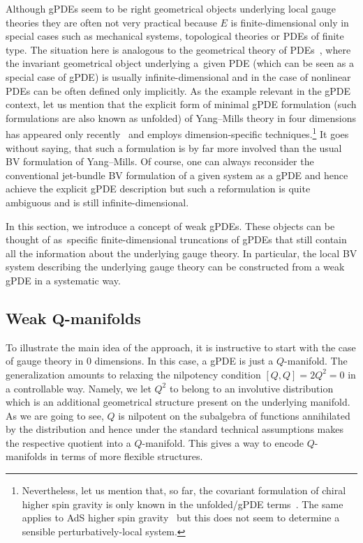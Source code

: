 \documentclass[pdftex]{sigma}
\numberwithin{equation}{section}
\theoremstyle{definition}
\begin{document}
Although gPDEs seem to be right geometrical objects underlying local gauge theories they are often not very practical because $E$ is finite-dimensional only in special cases such as mechanical systems, topological theories or PDEs of finite type. The situation here is analogous to the geometrical theory of PDEs~\cite{Krasil?shchik-Lychagin-Vinogradov,Krasil'shchik:2010ij, Vinogradov1981}, where the invariant geometrical object underlying a~given PDE (which can be seen as a special case of gPDE) is usually infinite-dimensional and in the case of nonlinear PDEs can be often defined only implicitly. As the example relevant in the gPDE context, let us mention that the explicit form of minimal gPDE formulation (such formulations are also known as unfolded) of Yang--Mills theory in four dimensions has appeared only recently~\cite{Misuna:2024dlx} and employs dimension-specific techniques.\footnote{Nevertheless, let us mention that, so far, the covariant formulation of chiral higher spin gravity is only known in the unfolded/gPDE terms~\cite{Sharapov:2022faa, Sharapov:2022wpz}. The same applies to AdS higher spin gravity~\cite{Vasiliev:1999ba, Vasiliev:2003ev} but this does not seem to determine a sensible perturbatively-local system.} It goes without saying, that such a formulation is by far more involved than the usual BV formulation of Yang--Mills. Of course, one can always reconsider the conventional jet-bundle BV formulation of a given system as a gPDE and hence achieve the explicit gPDE description but such a reformulation is quite ambiguous and is still infinite-dimensional.

In this section, we introduce a concept of weak gPDEs. These objects can be thought of as~specific finite-dimensional truncations of gPDEs that still contain all the information about the underlying gauge theory. In particular, the local BV system describing the underlying gauge theory can be constructed from a weak gPDE in a systematic way.

\subsection[Weak Q-manifolds]{Weak $\boldsymbol{Q}$-manifolds}

To illustrate the main idea of the approach, it is instructive to start with the %
case of gauge theory in 0 dimensions. In this case, a gPDE is just a $Q$-manifold.
The generalization amounts to relaxing the nilpotency condition $[Q,Q]=2Q^2=0$ in a controllable way. Namely, we let $Q^2$ to belong to an involutive distribution which is an additional geometrical structure present on the underlying manifold. As we are going to see, $Q$ is nilpotent on the subalgebra of functions annihilated by the distribution and hence under the standard technical assumptions makes the respective quotient into a $Q$-manifold. This gives a way to encode $Q$-manifolds in terms of more flexible structures.
\end{document}
